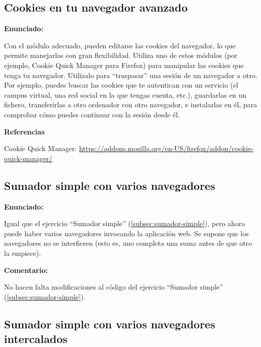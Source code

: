 \subsection{Cookies en tu navegador avanzado}
\label{subsec:cookies-navegador-2}

\textbf{Enunciado:}

Con el módulo adecuado, pueden editarse las cookies del navegador, lo que permite manejarlas con gran flexibilidad. Utiliza uno de estos módulos (por ejemplo, Cookie Quick Manager para Firefox) para manipular las cookies que tenga tu navegador. Utilízalo para ``traspasar'' una sesión de un navegador a otro. Por ejemplo, puedes buscar las cookies que te autentican con un servicio (el campus virtual, una red social en la que tengas cuenta, etc.), guardarlas en un fichero, transferirlas a otro ordenador con otro navegador, e instalarlas en él, para comprobar cómo puedes continuar con la sesión desde él.

\textbf{Referencias}

Cookie Quick Manager: \url{https://addons.mozilla.org/en-US/firefox/addon/cookie-quick-manager/}


\subsection{Sumador simple con varios navegadores}
\label{subsec:sumador-simple-varios}

\textbf{Enunciado:}

Igual que el ejercicio ``Sumador simple'' (\ref{subsec:sumador-simple}), pero ahora puede haber varios navegadores invocando la aplicación web. Se supone que los navegadores no se interfieren (esto es, uno completa una suma antes de que otro la empiece).

\textbf{Comentario:}

No hacen falta modificaciones al código del ejercicio ``Sumador simple'' (\ref{subsec:sumador-simple}).


\subsection{Sumador simple con varios navegadores intercalados}
\label{subsec:sumador-simple-varios-intercalados}

